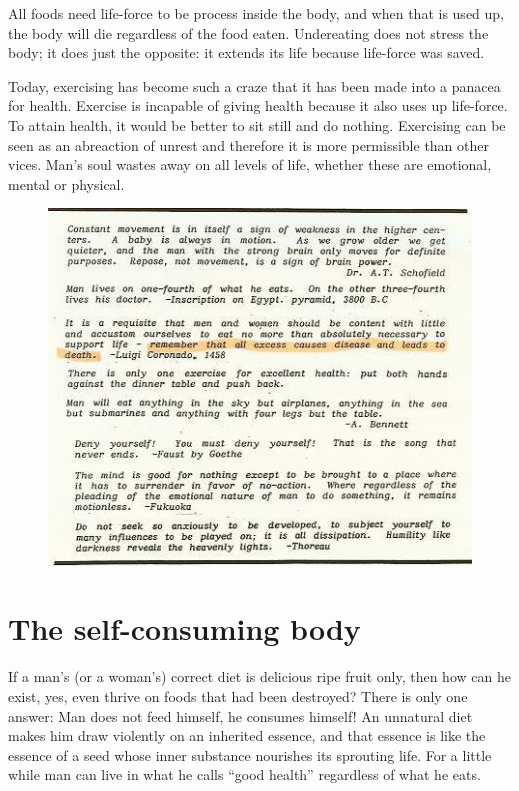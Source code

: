 \documentclass[12pt,letterpaper]{article}
\begin{document}
All foods need life-force to be process inside the body, and when that
is used up, the body will die regardless of the food
eaten. Undereating does not stress the body; it does just the
opposite: it extends its life because life-force was saved.

Today, exercising has become such a craze that it has been made into a
panacea for health. Exercise is incapable of giving health because it
also uses up life-force. To attain health, it would be better to sit
still and do nothing.  Exercising can be seen as an abreaction of
unrest and therefore it is more permissible than other vices. Man's
soul wastes away on all levels of life, whether these are emotional,
mental or physical.

\begin{figure} \centering
  \includegraphics[width=\textwidth]{p8.jpg}
\end{figure}


\section{The self-consuming body}

If a man's (or a woman's) correct diet is delicious ripe fruit only,
then how can he exist, yes, even thrive on foods that had been
destroyed? There is only one answer: Man does not feed himself, he
consumes himself! An unnatural diet makes him draw violently on an
inherited essence, and that essence is like the essence of a seed
whose inner substance nourishes its sprouting life. For a little while
man can live in what he calls ``good health'' regardless of what he
eats.
\end{document}

